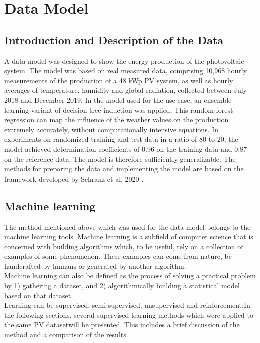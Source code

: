 \chapter{Data Model}
\label{ch:datamodel}
\newpage

\section{Introduction and Description of the Data}
\label{sec:description_pvdata}
A data model was designed to show the energy production of the photovoltaic system. The model was based on real measured data, comprising 10,968 hourly measurements of the production of a 48 kWp PV system, as well as hourly averages of temperature, humidity and global radiation, collected between July 2018 and December 2019. In the model used for the use-case, an ensemble learning variant of decision tree induction was applied. This random forest regression can map the influence of the weather values on the production extremely accurately, without computationally intensive equations. In experiments on randomized training and test data in a ratio of 80 to 20, the model achieved determination coefficients of 0.96 on the training data and 0.87 on the reference data. The model is therefore sufficiently generalizable. The methods for preparing the data and implementing the model are based on the framework developed by Schranz et al. 2020 \cite{schranz2020water}.

\section{Machine learning}

The method mentioned above which was used for the data model belongs to the machine learning tools. Machine learning is a subfield of computer science that is concerned with building algorithms which, to be useful, rely on a collection of examples of some phenomenon. These examples can come from nature, be handcrafted by humans or generated by another algorithm. \\
Machine learning can also be defined as the process of solving a practical problem by 1) gathering a dataset, and 2) algorithmically building a statistical model based on that dataset. \\
Learning can be supervised, semi-supervised, unsupervised and reinforcement.In the following sections, several supervised learning methods which were applied to the same PV datasetwill be presented. This includes a brief discussion of the method and a comparison of the results. \\
\\


